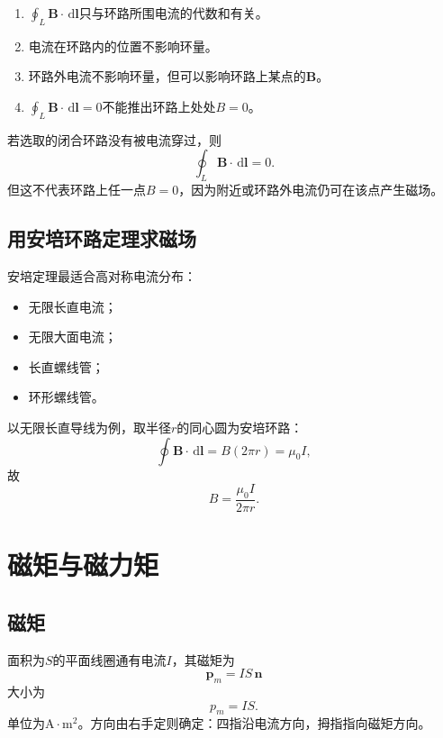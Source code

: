 \documentclass[UTF8,zihao=-4]{ctexart}
\newcommand{\dd}{\,\mathrm d}
\newcommand{\muz}{\mu_0}
\newcommand{\ve}[1]{\bm{#1}}
\newcommand{\B}{\ve B}
\newcommand{\dl}{\dd\ve l}
\begin{document}
\begin{keybox}[安培环路定理的判断题核心]
\begin{enumerate}
  \item \(\oint_L\B\cdot\dl\)只与环路所围电流的代数和有关。
  \item 电流在环路内的位置不影响环量。
  \item 环路外电流不影响环量，但可以影响环路上某点的\(\B\)。
  \item \(\oint_L\B\cdot\dl=0\)不能推出环路上处处\(B=0\)。
\end{enumerate}
\end{keybox}

\begin{examplebox}
若选取的闭合环路没有被电流穿过，则
\[
\oint_L\B\cdot\dl=0.
\]
但这不代表环路上任一点\(B=0\)，因为附近或环路外电流仍可在该点产生磁场。
\end{examplebox}

\subsection{用安培环路定理求磁场}

安培定理最适合高对称电流分布：
\begin{itemize}
  \item 无限长直电流；
  \item 无限大面电流；
  \item 长直螺线管；
  \item 环形螺线管。
\end{itemize}

以无限长直导线为例，取半径\(r\)的同心圆为安培环路：
\[
\oint\B\cdot\dl=B(2\pi r)=\muz I,
\]
故
\begin{equation}
B=\frac{\muz I}{2\pi r}.
\end{equation}

\section{磁矩与磁力矩}

\subsection{磁矩}

面积为\(S\)的平面线圈通有电流\(I\)，其磁矩为
\begin{equation}
\boxed{\ve p_m=I S\,\ve n}
\end{equation}
大小为
\begin{equation}
 p_m=IS.
\end{equation}
单位为\(\mathrm{A\cdot m^2}\)。方向由右手定则确定：四指沿电流方向，拇指指向磁矩方向。
\end{document}
